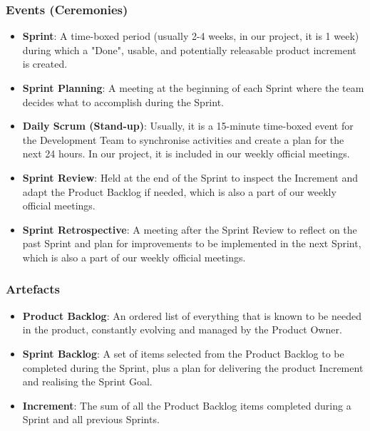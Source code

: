 \documentclass[sigconf,nonacm]{acmart}
\begin{document}
\subsubsection{Events (Ceremonies)}
\begin{itemize}
    \item \textbf{Sprint}: A time-boxed period (usually 2-4 weeks, in our project, it is 1 week) during which a "Done", usable, and potentially releasable product increment is created.
    \item \textbf{Sprint Planning}: A meeting at the beginning of each Sprint where the team decides what to accomplish during the Sprint.
    \item \textbf{Daily Scrum (Stand-up)}: Usually, it is a 15-minute time-boxed event for the Development Team to synchronise activities and create a plan for the next 24 hours. In our project, it is included in our weekly official meetings.
    \item \textbf{Sprint Review}: Held at the end of the Sprint to inspect the Increment and adapt the Product Backlog if needed, which is also a part of our weekly official meetings.
    \item \textbf{Sprint Retrospective}: A meeting after the Sprint Review to reflect on the past Sprint and plan for improvements to be implemented in the next Sprint, which is also a part of our weekly official meetings.
\end{itemize}

\subsubsection{Artefacts}
\begin{itemize}
    \item \textbf{Product Backlog}: An ordered list of everything that is known to be needed in the product, constantly evolving and managed by the Product Owner.
    \item \textbf{Sprint Backlog}: A set of items selected from the Product Backlog to be completed during the Sprint, plus a plan for delivering the product Increment and realising the Sprint Goal.
    \item \textbf{Increment}: The sum of all the Product Backlog items completed during a Sprint and all previous Sprints.
\end{itemize}
\end{document}

